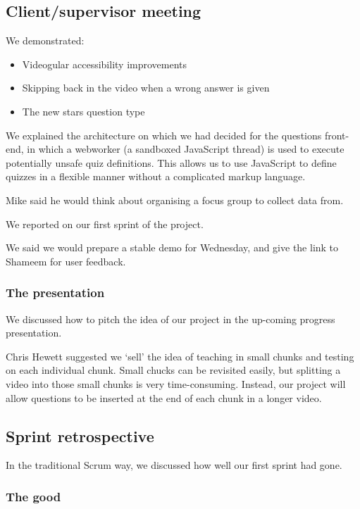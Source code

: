 \subsection{Client/supervisor meeting}

We demonstrated:

\begin{itemize}
\itemsep1pt\parskip0pt
\item
  Videogular accessibility improvements
\item
  Skipping back in the video when a wrong answer is given
\item
  The new stars question type
\end{itemize}

We explained the architecture on which we had decided for the questions
front-end, in which a \gls{webworker} (a sandboxed JavaScript thread) is used
to execute potentially unsafe quiz definitions. This allows us to use
JavaScript to define quizzes in a flexible manner without a complicated
markup language.

Mike said he would think about organising a focus group to collect data
from.

We reported on our first sprint of the project.

We said we would prepare a stable demo for Wednesday, and give the link
to Shameem for user feedback.

\subsubsection{The presentation}

We discussed how to pitch the idea of our project in the up-coming
progress presentation.

Chris Hewett suggested we `sell' the idea of teaching in small chunks
and testing on each individual chunk. Small chucks can be revisited
easily, but splitting a video into those small chunks is very
time-consuming. Instead, our project will allow questions to be inserted
at the end of each chunk in a longer video.

\subsection{Sprint retrospective}

In the traditional Scrum way, we discussed how well our first sprint had
gone.

\subsubsection{The good}

